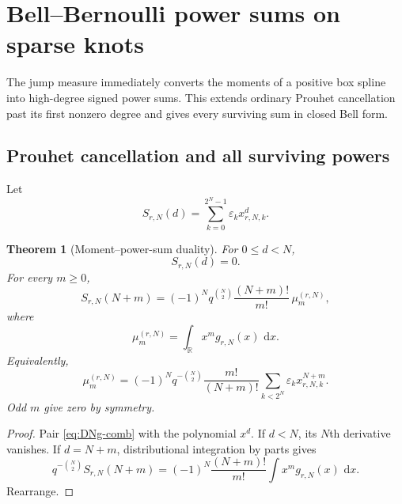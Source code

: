 \documentclass[11pt,oneside]{article}
\numberwithin{equation}{section}
\newtheorem{theorem}{Theorem}[section]
\theoremstyle{definition}
\theoremstyle{remark}
\newcommand{\R}{\mathbb R}
\newcommand{\dd}{\,\mathrm d}
\newcommand{\eps}{\varepsilon}
\begin{document}
\section{Bell--Bernoulli power sums on sparse knots}
\label{sec:power-sums}

The jump measure immediately converts the moments of a positive box spline
into high-degree signed power sums.  This extends ordinary Prouhet cancellation
past its first nonzero degree and gives every surviving sum in closed Bell form.

\subsection{Prouhet cancellation and all surviving powers}

Let
\begin{equation}
 S_{r,N}(d)=\sum_{k=0}^{2^N-1}\eps_k x_{r,N,k}^{d}.         \label{eq:S-rNd}
\end{equation}

\begin{theorem}[Moment--power-sum duality]
\label{thm:moment-power-duality}
For $0\le d<N$,
\begin{equation}
 S_{r,N}(d)=0.                                             \label{eq:Prouhet-sparse}
\end{equation}
For every $m\ge0$,
\begin{equation}
 \boxed{\displaystyle
 S_{r,N}(N+m)=(-1)^Nq^{\binom N2}
   \frac{(N+m)!}{m!}\,\mu_m^{(r,N)},}                     \label{eq:power-sum-moment}
\end{equation}
where
\begin{equation}
 \mu_m^{(r,N)}=\int_{\R}x^m g_{r,N}(x)\,\dd x.            \label{eq:finite-moment}
\end{equation}
Equivalently,
\begin{equation}
 \boxed{\displaystyle
 \mu_m^{(r,N)}=(-1)^Nq^{-\binom N2}\frac{m!}{(N+m)!}
   \sum_{k<2^N}\eps_kx_{r,N,k}^{N+m}.}                   \label{eq:moment-from-TM}
\end{equation}
Odd $m$ give zero by symmetry.
\end{theorem}

\begin{proof}
Pair \eqref{eq:DNg-comb} with the polynomial $x^d$.  If $d<N$, its $N$th
derivative vanishes.  If $d=N+m$, distributional integration by parts gives
\[
 q^{-\binom N2}S_{r,N}(N+m)
 =(-1)^N\frac{(N+m)!}{m!}\int x^m g_{r,N}(x)\,\dd x.
\]
Rearrange.
\end{proof}
\end{document}
